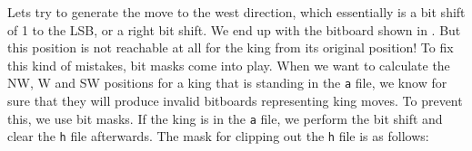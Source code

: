%
Lets try to generate the move to the west direction, which essentially is a bit shift of 1 to the LSB, or a right bit shift.
We end up with the bitboard shown in .
But this position is not reachable at all for the king from its original position!
To fix this kind of mistakes, bit masks come into play.
When we want to calculate the NW, W and SW positions for a king that is standing in the \texttt{a} file, we know for sure that they will produce invalid bitboards representing king moves.
To prevent this, we use bit masks.
If the king is in the \texttt{a} file, we perform the bit shift and clear the \texttt{h} file afterwards.
The mask for clipping out the \texttt{h} file is as follows:
%
\begin{figure}[H]
\centering
{}
\end{figure}
%
